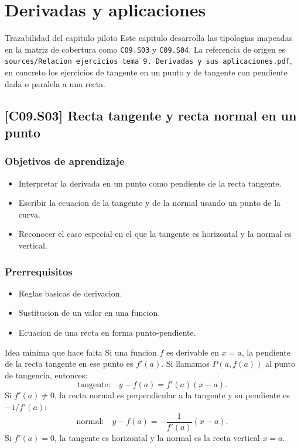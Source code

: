 \setcounter{chapter}{8}
\chapter{Derivadas y aplicaciones}

\begin{theorybox}{Trazabilidad del capitulo piloto}
Este capitulo desarrolla las tipologias mapeadas en la matriz de cobertura como
\texttt{C09.S03} y \texttt{C09.S04}. La referencia de origen es
\texttt{sources/Relacion ejercicios tema 9. Derivadas y sus aplicaciones.pdf}, en concreto
los ejercicios de tangente en un punto y de tangente con pendiente dada o paralela a una
recta.
\end{theorybox}

\section{[C09.S03] Recta tangente y recta normal en un punto}

\subsection*{Objetivos de aprendizaje}
\begin{itemize}
  \item Interpretar la derivada en un punto como pendiente de la recta tangente.
  \item Escribir la ecuacion de la tangente y de la normal usando un punto de la curva.
  \item Reconocer el caso especial en el que la tangente es horizontal y la normal es vertical.
\end{itemize}

\subsection*{Prerrequisitos}
\begin{itemize}
  \item Reglas basicas de derivacion.
  \item Sustitucion de un valor en una funcion.
  \item Ecuacion de una recta en forma punto-pendiente.
\end{itemize}

\begin{theorybox}{Idea minima que hace falta}
Si una funcion \(f\) es derivable en \(x=a\), la pendiente de la recta tangente en ese punto es
\(f'(a)\). Si llamamos \(P(a,f(a))\) al punto de tangencia, entonces:
\[
  \text{tangente:}\quad y-f(a)=f'(a)(x-a).
\]
Si \(f'(a)\neq 0\), la recta normal es perpendicular a la tangente y su pendiente es
\(-1/f'(a)\):
\[
  \text{normal:}\quad y-f(a)=-\frac{1}{f'(a)}(x-a).
\]
Si \(f'(a)=0\), la tangente es horizontal y la normal es la recta vertical \(x=a\).
\end{theorybox}

